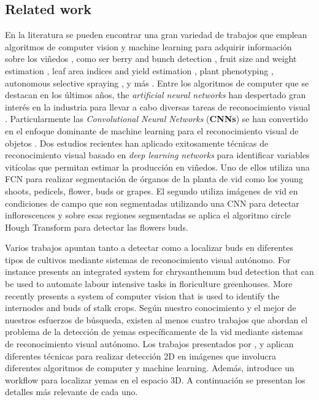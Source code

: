 \documentclass[a4paper,authoryear,review]{elsarticle}
\begin{document}
	
	
	
	\subsection{Related work}   \label{sec:related}
	
	En la literatura se pueden encontrar una gran variedad de trabajos que emplean algoritmos de computer vision y machine learning para adquirir información sobre los viñedos \citep{seng2018computer}, como ser berry and bunch detection \citep{nuske2011yield}, fruit size and weight estimation \citep{tardaguila2012automatic}, leaf area indices and yield estimation \citep{diago2012grapevine}, plant phenotyping \citep{herzog2014objective, herzog2014initial}, autonomous selective spraying \citep{berenstein2010grape}, y más \citep{tardaguila2012applications, whalley2013applications}. Entre los algoritmos de computer que se destacan en los últimos años, the \emph{artificial neural networks} han despertado gran interés en la industria para llevar a cabo diversas tareas de reconocimiento visual \citep{hirano2006industry, kahng2017cti, tilgner2019multi}. Particularmente las \emph{Convolutional Neural Networks} (\textbf{CNNs}) se han convertido en el enfoque dominante de machine learning para el reconocimiento visual de objetos \citep{ning2017inception}. Dos estudios recientes han aplicado exitosamente técnicas de reconocimiento visual basado en \emph{deep learning networks} para identificar variables vitícolas que permitan estimar la producción en viñedos. Uno de ellos \citet{grimm2019adaptable} utiliza una FCN para realizar segmentación de órganos de la planta de vid como los young shoots, pedicels, flower, buds or grapes. El segundo \citet{rudolph2018efficient} utiliza imágenes de vid en condiciones de campo que son segmentadas utilizando una CNN para detectar inflorescences y sobre esas regiones segmentadas se aplica el algoritmo circle Hough Transform para detectar las flowers buds.
	
	Varios trabajos apuntan tanto a detectar como a localizar buds en diferentes tipos de cultivos mediante sistemas de reconocimiento visual autónomo. For instance \citet{tarry2014integrated} presents an integrated system for chrysanthemum bud detection that can be used to automate labour intensive tasks in floriculture greenhouses. More recently \citet{zhao2018research} presents a system  of  computer  vision  that is used  to  identify  the  internodes and  buds  of  stalk  crops. Según nuestro conocimiento y el mejor de nuestros esfuerzos de búsqueda, existen al menos cuatro trabajos que abordan el problema de la detección de yemas específicamente de la vid mediante sistemas de reconocimiento visual autónomo. Los trabajos presentados por \citet{xu2014detection}, \citet{herzog2014initial} y \citet{perez2017image} aplican diferentes técnicas para realizar detección 2D en imágenes que involucra diferentes algoritmos de computer y machine learning. Además, \citet{diaz2018grapevine} introduce un workflow para localizar yemas en el espacio 3D. A continuación se presentan los detalles más relevante de cada uno.
	
\end{document}
